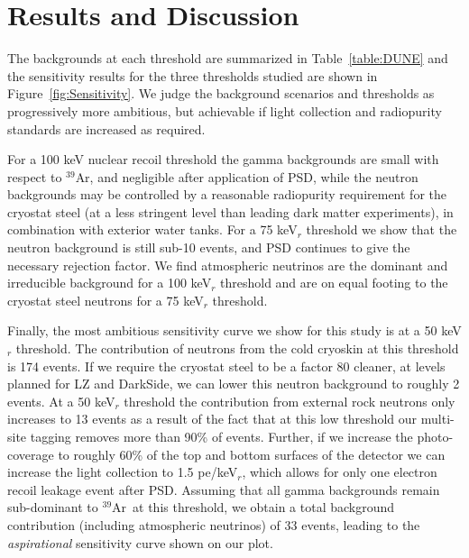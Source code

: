 \documentclass[a4paper,11pt]{article}
\newcommand{\artn}{$^{39}$Ar}
\begin{document}
\section{Results and Discussion}
 The backgrounds at each threshold are summarized in Table~\ref{table:DUNE} and the sensitivity results for the three thresholds studied are shown in Figure~\ref{fig:Sensitivity}. We judge the background scenarios and thresholds as progressively more ambitious, but  achievable if light collection and radiopurity standards are increased as required. 
 
 For a 100 keV nuclear recoil threshold the gamma backgrounds are small with respect to \artn, and negligible after application of PSD, while the neutron backgrounds may be controlled by a reasonable radiopurity requirement for the cryostat steel (at a less stringent level than leading dark matter experiments), in combination with exterior water tanks. For a 75 keV$_r$ threshold we show that the neutron background is still sub-10 events, and PSD continues to give the necessary rejection factor. We find  atmospheric neutrinos are the dominant and irreducible background for a 100 keV$_r$ threshold and are on equal footing to the cryostat steel neutrons for a 75 keV$_r$ threshold.

Finally, the most ambitious sensitivity curve we show for this study is at a 50 keV$_r$ threshold.  The contribution of neutrons from the cold cryoskin at this threshold is 174 events. If we require the cryostat steel to be a factor 80 cleaner, at levels planned for LZ and DarkSide, we can lower this neutron background to roughly 2 events. At a 50 keV$_r$ threshold the contribution from external rock neutrons only increases to 13 events as a result of the fact that at this low threshold our multi-site tagging removes more than 90\% of events. Further, if we increase the photo-coverage to roughly 60\% of the top and bottom surfaces of the detector we can increase the light collection to 1.5 pe/keV$_r$, which allows for only one electron recoil leakage event after PSD. Assuming that all gamma backgrounds remain sub-dominant to \artn~at this threshold, we obtain a total background contribution (including atmospheric neutrinos) of 33 events, leading to the {\em aspirational} sensitivity curve shown on our plot.
\end{document}
